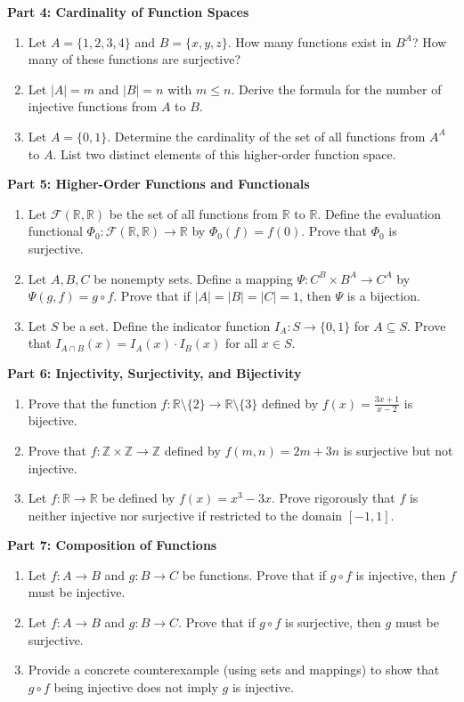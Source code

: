 \documentclass[11pt, letterpaper]{article}
\theoremstyle{definition}
\theoremstyle{remark}
\newcommand{\R}{\mathbb{R}}
\newcommand{\Z}{\mathbb{Z}}
\newcommand{\F}{\mathcal{F}}
\begin{document}
\textbf{Part 4: Cardinality of Function Spaces}
\begin{enumerate}[label=\textbf{\arabic*.}, resume]
    \item Let $A = \{1, 2, 3, 4\}$ and $B = \{x, y, z\}$. How many functions exist in $B^A$? How many of these functions are surjective?
    \item Let $|A| = m$ and $|B| = n$ with $m \le n$. Derive the formula for the number of injective functions from $A$ to $B$.
    \item Let $A = \{0, 1\}$. Determine the cardinality of the set of all functions from $A^A$ to $A$. List two distinct elements of this higher-order function space.
\end{enumerate}

\textbf{Part 5: Higher-Order Functions and Functionals}
\begin{enumerate}[label=\textbf{\arabic*.}, resume]
    \item Let $\F(\R, \R)$ be the set of all functions from $\R$ to $\R$. Define the evaluation functional $\Phi_0: \F(\R, \R) \to \R$ by $\Phi_0(f) = f(0)$. Prove that $\Phi_0$ is surjective.
    \item Let $A, B, C$ be nonempty sets. Define a mapping $\Psi: C^B \times B^A \to C^A$ by $\Psi(g, f) = g \circ f$. Prove that if $|A|=|B|=|C|=1$, then $\Psi$ is a bijection.
    \item Let $S$ be a set. Define the indicator function $I_A: S \to \{0, 1\}$ for $A \subseteq S$. Prove that $I_{A \cap B}(x) = I_A(x) \cdot I_B(x)$ for all $x \in S$.
\end{enumerate}

\textbf{Part 6: Injectivity, Surjectivity, and Bijectivity}
\begin{enumerate}[label=\textbf{\arabic*.}, resume]
    \item Prove that the function $f: \R \setminus \{2\} \to \R \setminus \{3\}$ defined by $f(x) = \frac{3x + 1}{x - 2}$ is bijective.
    \item Prove that $f: \Z \times \Z \to \Z$ defined by $f(m, n) = 2m + 3n$ is surjective but not injective.
    \item Let $f: \R \to \R$ be defined by $f(x) = x^3 - 3x$. Prove rigorously that $f$ is neither injective nor surjective if restricted to the domain $[-1, 1]$.
\end{enumerate}

\textbf{Part 7: Composition of Functions}
\begin{enumerate}[label=\textbf{\arabic*.}, resume]
    \item Let $f: A \to B$ and $g: B \to C$ be functions. Prove that if $g \circ f$ is injective, then $f$ must be injective.
    \item Let $f: A \to B$ and $g: B \to C$. Prove that if $g \circ f$ is surjective, then $g$ must be surjective.
    \item Provide a concrete counterexample (using sets and mappings) to show that $g \circ f$ being injective does not imply $g$ is injective.
\end{enumerate}
\end{document}
